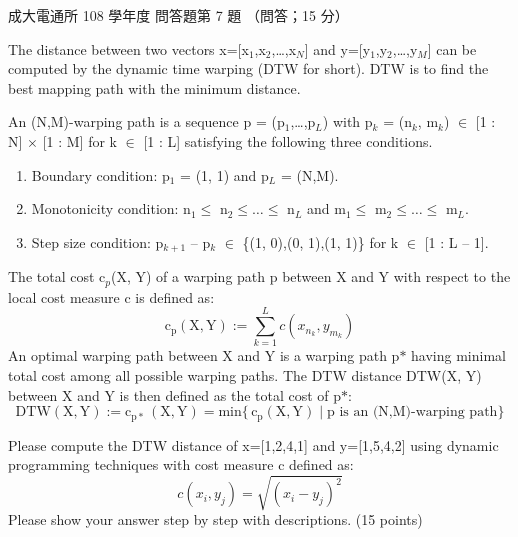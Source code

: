\begin{pastexam}[label={px:ncku-108-comm-ds-10}]{成大電通所 108 學年度 問答題第 7 題}
（問答；15 分）

The distance between two vectors x=[x$_1$,x$_2$,\ldots,x$_N$] and y=[y$_1$,y$_2$,\ldots,y$_M$] can be
computed by the dynamic time warping (DTW for short). DTW is to find the best mapping path with the
minimum distance.

An (N,M)-warping path is a sequence p = (p$_1$,\ldots,p$_L$) with p$_k$ = (n$_k$, m$_k$) $\in$ [1 : N]
$\times$ [1 : M] for k $\in$ [1 : L] satisfying the following three conditions.
\begin{enumerate}[label=(\roman*)]
\item Boundary condition: p$_1$ = (1, 1) and p$_L$ = (N,M).
\item Monotonicity condition: n$_1 \le$ n$_2 \le \ldots \le$ n$_L$ and m$_1 \le$ m$_2 \le \ldots \le$
m$_L$.
\item Step size condition: p$_{k+1}$ -- p$_k$ $\in$ \{(1, 0),(0, 1),(1, 1)\} for k $\in$ [1 : L -- 1].
\end{enumerate}
The total cost c$_p$(X, Y) of a warping path p between X and Y with respect to the local cost measure c
is defined as:
\[ \mathrm{c_p(X, Y)} := \textstyle\sum_{k=1}^{L} c(x_{n_k}, y_{m_k}) \]
An optimal warping path between X and Y is a warping path p$*$ having minimal total cost among all
possible warping paths. The DTW distance DTW(X, Y) between X and Y is then defined as the total cost of
p$*$:
\[ \mathrm{DTW(X, Y) := c_{p*}\,(X, Y) = min\{\, c_p(X, Y) \mid p \text{ is an (N,M)-warping path}\}} \]

Please compute the DTW distance of x=[1,2,4,1] and y=[1,5,4,2] using dynamic programming techniques with
cost measure c defined as:
\[ c(x_i, y_j) = \sqrt{(x_i - y_j)^2} \]
Please show your answer step by step with descriptions. (15 points)
\end{pastexam}


